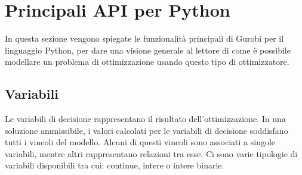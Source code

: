 \section{Principali API per Python}
In questa sezione vengono spiegate le funzionalità principali di Gurobi per il linguaggio Python, per dare una visione generale al lettore di come è possibile modellare un problema di ottimizzazione usando questo tipo di ottimizzatore.


\subsection{Variabili}
Le variabili di decisione rappresentano il risultato dell'ottimizzazione.
In una soluzione ammissibile, i valori calcolati per le variabili di decisione soddisfano tutti i vincoli del modello. Alcuni di questi vincoli sono associati a singole variabili, mentre altri rappresentano relazioni tra esse.
Ci sono varie tipologie di variabili disponibili tra cui: continue, intere o intere binarie.

